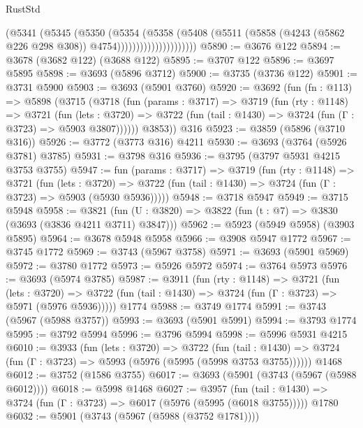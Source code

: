 \begin{lexlean}{RustStd}
\begin{coremodule}
                              (@5341
                                (@5345
                                  (@5350
                                    (@5354
                                      (@5358
                                        (@5408
                                          (@5511
                                            (@5858
                                              (@4243 (@5862 @226 @298 @308))
                                              @4754)))))))))))))))))))))
@5890 := @3676 @122
@5894 := @3678 (@3682 @122) (@3688 @122)
@5895 := @3707 @122
@5896 := @3697 @5895
@5898 := @3693 (@5896 @3712)
@5900 := @3735 (@3736 @122)
@5901 := @3731 @5900
@5903 := @3693 (@5901 @3760)
@5920 := @3692
    (fun (fn : @113) =>
    @5898
      (@3715
        (@3718
          (fun (params : @3717) =>
          @3719
            (fun (rty : @1148) =>
            @3721
              (fun (lets : @3720) =>
              @3722 (fun (tail : @1430) => @3724 (fun (Γ : @3723) => @5903 @3807))))))
        @3853))
    @316
@5923 := @3859 (@5896 (@3710 @316))
@5926 := @3772 (@3773 @316) @4211
@5930 := @3693 (@3764 (@5926 @3781) @3785)
@5931 := @3798 @316
@5936 := @3795 (@3797 @5931 @4215 @3753 @3755)
@5947 := fun (params : @3717) =>
  @3719
    (fun (rty : @1148) =>
    @3721
      (fun (lets : @3720) =>
      @3722 (fun (tail : @1430) => @3724 (fun (Γ : @3723) => @5903 (@5930 @5936)))))
@5948 := @3718 @5947
@5949 := @3715 @5948
@5958 := @3821 (fun (U : @3820) => @3822 (fun (t : @7) => @3830 (@3693 (@3836 @4211 @3711) @3847)))
@5962 := @5923 (@5949 @5958) (@3903 @5895)
@5964 := @3678 @5948 @5958
@5966 := @3908 @5947 @1772
@5967 := @3745 @1772
@5969 := @3743 (@5967 @3758)
@5971 := @3693 (@5901 @5969)
@5972 := @3780 @1772
@5973 := @5926 @5972
@5974 := @3764 @5973
@5976 := @3693 (@5974 @3785)
@5987 := @3911
    (fun (rty : @1148) =>
    @3721
      (fun (lets : @3720) =>
      @3722 (fun (tail : @1430) => @3724 (fun (Γ : @3723) => @5971 (@5976 @5936)))))
    @1774
@5988 := @3749 @1774
@5991 := @3743 (@5967 (@5988 @3757))
@5993 := @3693 (@5901 @5991)
@5994 := @3793 @1774
@5995 := @3792 @5994
@5996 := @3796 @5994
@5998 := @5996 @5931 @4215
@6010 := @3933
    (fun (lets : @3720) =>
    @3722
      (fun (tail : @1430) => @3724 (fun (Γ : @3723) => @5993 (@5976 (@5995 (@5998 @3753 @3755))))))
    @1468
@6012 := @3752 (@1586 @3755)
@6017 := @3693 (@5901 (@3743 (@5967 (@5988 @6012))))
@6018 := @5998 @1468
@6027 := @3957
    (fun (tail : @1430) => @3724 (fun (Γ : @3723) => @6017 (@5976 (@5995 (@6018 @3755)))))
    @1780
@6032 := @5901 (@3743 (@5967 (@5988 (@3752 @1781))))

\end{coremodule}
\end{lexlean}
